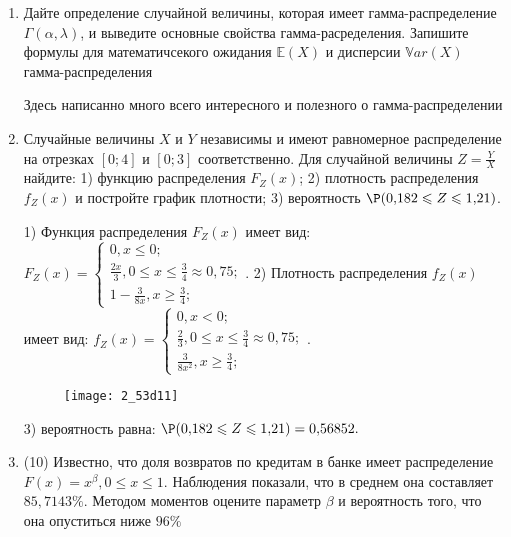 \documentclass[a4paper,12pt]{article}
\begin{document}
\begin{enumerate}


\item

Дайте определение случайной величины, которая имеет гамма-распределение $\Gamma(\alpha,  \lambda)$, и выведите основные свойства гамма-расределения. Запишите формулы для математичсекого ожидания
$\mathbb{E}(X)$ и дисперсии $\mathbb{V}ar(X)$ гамма-распределения




Здесь написанно много всего интересного и полезного о гамма-распределении


\item



Случайные величины $X$ и $Y$ независимы и имеют равномерное
распределение на отрезках $[0;4]$ и $[0;3]$ соответственно. Для случайной величины $Z=\frac{Y}{X}$ найдите: 
1) функцию распределения $F_Z(x)$;
2) плотность распределения $f_Z(x)$ и постройте график плотности;
3) вероятность $\P(0,\!182\leqslant Z\leqslant 1,\!21)$.




1) Функция распределения $F_Z(x)$ имеет вид:
$
F_Z(x)=\left\{
\begin{array}{l}
0, x\leqslant 0;\\
\frac{2 x}{3}, 0\leqslant x\leqslant \frac{3}{4}\approx 0,\!75;\\
1 - \frac{3}{8 x}, x\geqslant\frac{3}{4};
\end{array}.
\right.
$
2) Плотность распределения $f_Z(x)$ имеет вид:
$
f_Z(x)=\left\{
\begin{array}{l}
0, x<0;\\
\frac{2}{3}, 0\leqslant x\leqslant \frac{3}{4}\approx 0,\!75;\\
\frac{3}{8 x^{2}}, x\geqslant\frac{3}{4};
\end{array}.
\right.
$


\begin{figure}[H]
    \texttt{[image: 2\_53d11]}
\end{figure}


3) вероятность равна:
$
\P(0,\!182\leqslant Z\leqslant 1,\!21)=
0,\!56852.
$


\item


(10) Известно, что доля возвратов по кредитам в банке имеет распределение $F(x) = x ^{\beta}, 0 \leqslant x \leqslant 1$.
Наблюдения показали, что в среднем она составляет $85,7143\%$. Методом моментов оцените параметр $\beta$ и
вероятность того, что она опуститься ниже $96\%$





\end{enumerate}
\end{document}
